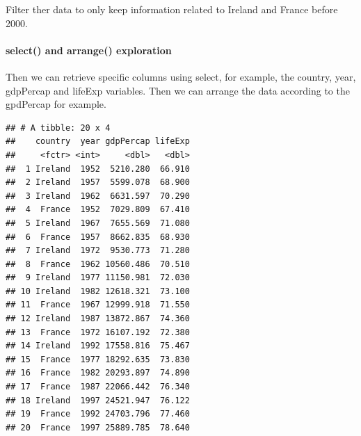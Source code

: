 \documentclass[]{article}
\newenvironment{Shaded}{\begin{snugshade}}{\end{snugshade}}
\newcommand{\KeywordTok}[1]{\textcolor[rgb]{0.13,0.29,0.53}{\textbf{{#1}}}}
\newcommand{\DecValTok}[1]{\textcolor[rgb]{0.00,0.00,0.81}{{#1}}}
\newcommand{\StringTok}[1]{\textcolor[rgb]{0.31,0.60,0.02}{{#1}}}
\newcommand{\NormalTok}[1]{{#1}}
\let\oldparagraph\paragraph
\renewcommand{\paragraph}[1]{\oldparagraph{#1}\mbox{}}
\begin{document}
Filter ther data to only keep information related to Ireland and France
before 2000.

\begin{Shaded}
\end{Shaded}

\paragraph{select() and arrange()
exploration}\label{select-and-arrange-exploration}

Then we can retrieve specific columns using select, for example, the
country, year, gdpPercap and lifeExp variables. Then we can arrange the
data according to the gpdPercap for example.

\begin{Shaded}
\end{Shaded}

\begin{verbatim}
## # A tibble: 20 x 4
##    country  year gdpPercap lifeExp
##     <fctr> <int>     <dbl>   <dbl>
##  1 Ireland  1952  5210.280  66.910
##  2 Ireland  1957  5599.078  68.900
##  3 Ireland  1962  6631.597  70.290
##  4  France  1952  7029.809  67.410
##  5 Ireland  1967  7655.569  71.080
##  6  France  1957  8662.835  68.930
##  7 Ireland  1972  9530.773  71.280
##  8  France  1962 10560.486  70.510
##  9 Ireland  1977 11150.981  72.030
## 10 Ireland  1982 12618.321  73.100
## 11  France  1967 12999.918  71.550
## 12 Ireland  1987 13872.867  74.360
## 13  France  1972 16107.192  72.380
## 14 Ireland  1992 17558.816  75.467
## 15  France  1977 18292.635  73.830
## 16  France  1982 20293.897  74.890
## 17  France  1987 22066.442  76.340
## 18 Ireland  1997 24521.947  76.122
## 19  France  1992 24703.796  77.460
## 20  France  1997 25889.785  78.640
\end{verbatim}
\end{document}
